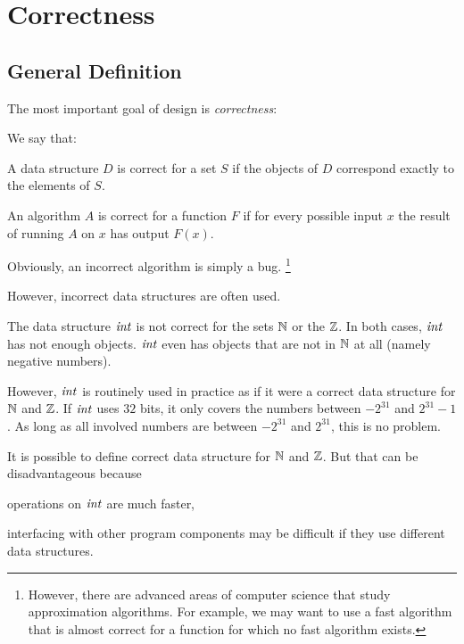 \section{Correctness}

\subsection{General Definition}

The most important goal of design is \emph{correctness}:

\begin{definition}\label{def:ad:correct}
We say that:
\begin{compactitem}
 \item A data structure $D$ is correct for a set $S$ if the objects of $D$ correspond exactly to the elements of $S$.
 \item An algorithm $A$ is correct for a function $F$ if for every possible input $x$ the result of running $A$ on $x$ has output $F(x)$.
\end{compactitem}
\end{definition}

Obviously, an incorrect algorithm is simply a bug.%
\footnote{However, there are advanced areas of computer science that study approximation algorithms.
For example, we may want to use a fast algorithm that is almost correct for a function for which no fast algorithm exists.}

However, incorrect data structures are often used.

\begin{example}
The data structure $\mathit{int}$ is not correct for the sets $\mathbb{N}$ or the $\mathbb{Z}$.
In both cases, $\mathit{int}$ has not enough objects.
$\mathit{int}$ even has objects that are not in $\mathbb{N}$ at all (namely negative numbers).

However, $\mathit{int}$ is routinely used in practice as if it were a correct data structure for $\mathbb{N}$ and $\mathbb{Z}$.
If $\mathit{int}$ uses $32$ bits, it only covers the numbers between $-2^{31}$ and $2^{31}-1$.
As long as all involved numbers are between $-2^{31}$ and $2^{31}$, this is no problem.

It is possible to define correct data structure for $\mathbb{N}$ and $\mathbb{Z}$.
But that can be disadvantageous because
\begin{compactitem}
\item operations on $\mathit{int}$ are much faster,
\item interfacing with other program components may be difficult if they use different data structures.
\end{compactitem}
\end{example}

